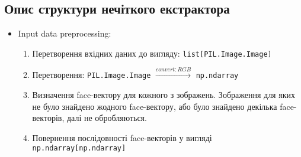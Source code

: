 \documentclass[11pt]{article}
\providecommand{\tightlist}{%
      \setlength{\itemsep}{0pt}\setlength{\parskip}{0pt}}
\begin{document}
    \hypertarget{ux43eux43fux438ux441-ux441ux442ux440ux443ux43aux442ux443ux440ux438-ux43dux435ux447ux456ux442ux43aux43eux433ux43e-ux435ux43aux441ux442ux440ux430ux43aux442ux43eux440ux430}{%
\subsection{Опис структури нечіткого
екстрактора}\label{ux43eux43fux438ux441-ux441ux442ux440ux443ux43aux442ux443ux440ux438-ux43dux435ux447ux456ux442ux43aux43eux433ux43e-ux435ux43aux441ux442ux440ux430ux43aux442ux43eux440ux430}}

\begin{itemize}
\tightlist
\item
  Input data preprocessing:

  \begin{enumerate}
  \def\labelenumi{\arabic{enumi}.}
  \tightlist
  \item
    Перетворення вхідних даних до вигляду:
    \texttt{list{[}PIL.Image.Image{]}}
  \item
    Перетворення: \texttt{PIL.Image.Image}
    \(\overset{convert: RGB}{\longrightarrow}\) \texttt{np.ndarray}
  \item
    Визначення face-вектору для кожного з зображень. Зображення для яких
    не було знайдено жодного face-вектору, або було знайдено декілька
    face-векторів, далі не обробляються.
  \item
    Повернення послідовності face-векторів у вигляді
    \texttt{np.ndarray{[}np.ndarray{]}}
  \end{enumerate}
\end{itemize}
\end{document}
